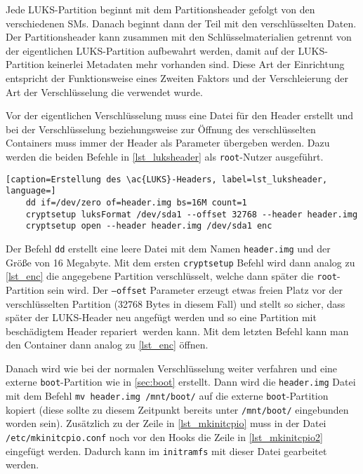 Jede \ac{LUKS}-Partition beginnt mit dem Partitionsheader gefolgt von den verschiedenen \acp{SM}. Danach beginnt dann der Teil mit den verschlüsselten Daten. Der Partitionsheader kann zusammen mit den Schlüsselmaterialien getrennt von der eigentlichen \ac{LUKS}-Partition aufbewahrt werden, damit auf der \ac{LUKS}-Partition keinerlei Metadaten mehr vorhanden sind.\cite[S. 2 f.]{LUKS2OnDiskFormat} Diese Art der Einrichtung entspricht der Funktionsweise eines Zweiten Faktors und der Verschleierung der Art der Verschlüsselung die verwendet wurde.

Vor der eigentlichen Verschlüsselung muss eine Datei für den Header erstellt und bei der Verschlüsselung beziehungsweise zur Öffnung des verschlüsselten Containers muss immer der Header als Parameter übergeben werden. Dazu werden die beiden Befehle in \autoref{lst_luksheader} als \texttt{root}-Nutzer ausgeführt.\cite{DmcryptSpecialtiesArchWiki}

\begin{lstlisting}[caption=Erstellung des \ac{LUKS}-Headers, label=lst_luksheader, language=]
	dd if=/dev/zero of=header.img bs=16M count=1
	cryptsetup luksFormat /dev/sda1 --offset 32768 --header header.img
	cryptsetup open --header header.img /dev/sda1 enc
\end{lstlisting}

Der Befehl \texttt{dd} erstellt eine leere Datei mit dem Namen \texttt{header.img} und der Größe von 16 Megabyte. Mit dem ersten \texttt{cryptsetup} Befehl wird dann analog zu \autoref{lst_enc} die angegebene Partition verschlüsselt, welche dann später die \texttt{root}-Partition sein wird. Der \texttt{--offset} Parameter erzeugt etwas freien Platz vor der verschlüsselten Partition {\small(32768 Bytes in diesem Fall)} und stellt so sicher, dass später der \ac{LUKS}-Header neu angefügt werden und so eine Partition mit beschädigtem Header \glqq repariert\grqq\ werden kann. Mit dem letzten Befehl kann man den Container dann analog zu \autoref{lst_enc} öffnen.

Danach wird wie bei der normalen Verschlüsselung weiter verfahren und eine externe \texttt{boot}-Partition wie in \autoref{sec:boot} erstellt. Dann wird die \texttt{header.img} Datei mit dem Befehl \texttt{mv header.img /mnt/boot/} auf die externe \texttt{boot}-Partition kopiert {\small(diese sollte zu diesem Zeitpunkt bereits unter \texttt{/mnt/boot/} eingebunden worden sein)}. Zusätzlich zu der Zeile in \autoref{lst_mkinitcpio} muss in der Datei \texttt{/etc/mkinitcpio.conf} noch vor den Hooks die Zeile in \autoref{lst_mkinitcpio2} eingefügt werden.\cite{DmcryptSpecialtiesArchWiki} Dadurch kann im \texttt{initramfs} mit dieser Datei gearbeitet werden.\cite{MkinitcpioArchWiki}

